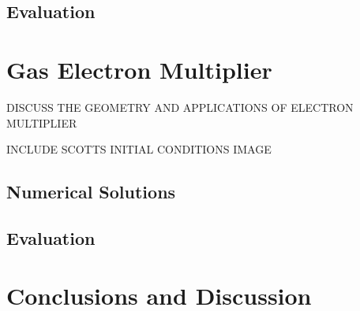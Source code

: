 \documentclass{article}
\begin{document}
\subsection{Evaluation}



\section{Gas Electron Multiplier}

DISCUSS THE GEOMETRY AND APPLICATIONS OF ELECTRON MULTIPLIER

INCLUDE SCOTTS INITIAL CONDITIONS IMAGE




\subsection{Numerical Solutions}



\subsection{Evaluation}



\section{Conclusions and Discussion}
\end{document}
